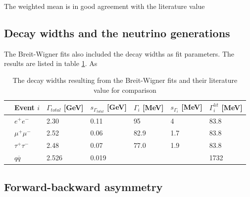 The weighted mean is in good agreement with the literature value

\subsection{Decay widths and the neutrino generations}
The Breit-Wigner fits also included the decay widths as fit parameters. The results are listed in table \ref{tb:decaywidthfitresults}. As
\begin{table}[H]\centering
	\begin{tabular}{@{}lllllll@{}}
		\toprule
		&Event $i$&$\Gamma_{total}$ [GeV]&$s_{\Gamma_{total}}$ [GeV]&$\Gamma_i$ [MeV]&$s_{\Gamma_i}$ [MeV]&$\Gamma^{lit}_i$ [MeV]\\
		\midrule
		&$e^+e^-$&2.30&0.11&95&4&83.8\\
		&$\mu^+\mu^-$&2.52&0.06&82.9&1.7&83.8\\
		&$\tau^+\tau^-$&2.48&0.07&77.0&1.9&83.8\\
		&$q\overline{q}$&2.526&0.019&&&1732\\
		\bottomrule
	\end{tabular}
	\caption[Breit-Wigner fit results: Decay widths ]{The decay widths resulting from the Breit-Wigner fits and their literature value for comparison }
	\label{tb:decaywidthfitresults}
\end{table}


\subsection{Forward-backward asymmetry}


